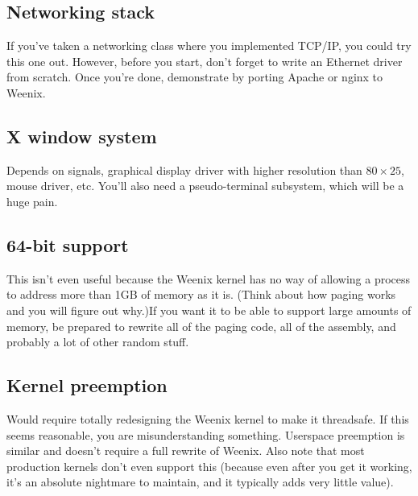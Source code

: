 \subsection{Networking stack}
If you've taken a networking class where you implemented TCP/IP, you could try this one out. However, before you start, don't forget to write an Ethernet driver from scratch. Once you're done, demonstrate by porting Apache or nginx to Weenix.
\subsection{X window system}
Depends on signals, graphical display driver with higher resolution than $80 \times 25$, mouse driver, etc. You'll also need a pseudo-terminal subsystem, which will be a huge pain.
\subsection{64-bit support}
This isn't even useful because the Weenix kernel has no way of allowing a process to address more than 1GB of memory as it is. (Think about how paging works and you will figure out why.)If you want it to be able to support large amounts of memory, be prepared to rewrite all of the paging code, all of the assembly, and probably a lot of other random stuff.
\subsection{Kernel preemption}
Would require totally redesigning the Weenix kernel to make it threadsafe. If this seems reasonable, you are misunderstanding something. Userspace preemption is similar and doesn't require a full rewrite of Weenix. Also note that most production kernels don't even support this (because even after you get it working, it's an absolute nightmare to maintain, and it typically adds very little value). %
 
